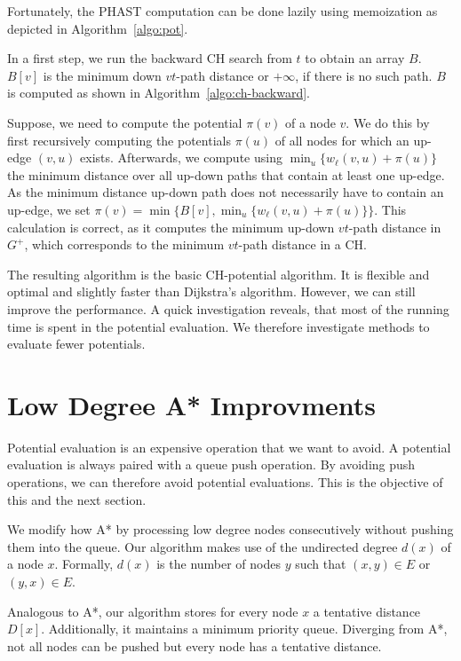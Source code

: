 \documentclass[letterpaper]{article} %
\begin{document}
Fortunately, the PHAST computation can be done lazily using memoization as depicted in Algorithm~\ref{algo:pot}.

In a first step, we run the backward CH search from $t$ to obtain an array $B$.
$B[v]$ is the minimum down $vt$-path distance or $+\infty$, if there is no such path.
$B$ is computed as shown in Algorithm~\ref{algo:ch-backward}.

Suppose, we need to compute the potential $\pi(v)$ of a node $v$.
We do this by first recursively computing the potentials $\pi(u)$ of all nodes for which an up-edge $(v,u)$ exists.
Afterwards, we compute using $\min_u\{w_\ell(v,u) + \pi(u)\}$ the minimum distance over all up-down paths that contain at least one up-edge.
As the minimum distance up-down path does not necessarily have to contain an up-edge, we set $\pi(v) = \min \{ B[v], \min_u\{w_\ell(v,u) + \pi(u)\} \}$.
This calculation is correct, as it computes the minimum up-down $vt$-path distance in $G^+$, which corresponds to the minimum $vt$-path distance in a CH.

The resulting algorithm is the basic CH-potential algorithm.
It is flexible and optimal and slightly faster than Dijkstra's algorithm.
However, we can still improve the performance.
A quick investigation reveals, that most of the running time is spent in the potential evaluation.
We therefore investigate methods to evaluate fewer potentials.

\section{Low Degree A* Improvments}

\label{sec:low-deg-improvment}

Potential evaluation is an expensive operation that we want to avoid.
A potential evaluation is always paired with a queue push operation.
By avoiding push operations, we can therefore avoid potential evaluations.
This is the objective of this and the next section.

We modify how A* by processing low degree nodes consecutively without pushing them into the queue.
Our algorithm makes use of the undirected degree $d(x)$ of a node $x$.
Formally, $d(x)$ is the number of nodes $y$ such that $(x,y)\in E$ or $(y,x)\in E$.

Analogous to A*, our algorithm stores for every node $x$ a tentative distance $D[x]$.
Additionally, it maintains a minimum priority queue.
Diverging from A*, not all nodes can be pushed but every node has a tentative distance.
\end{document}
